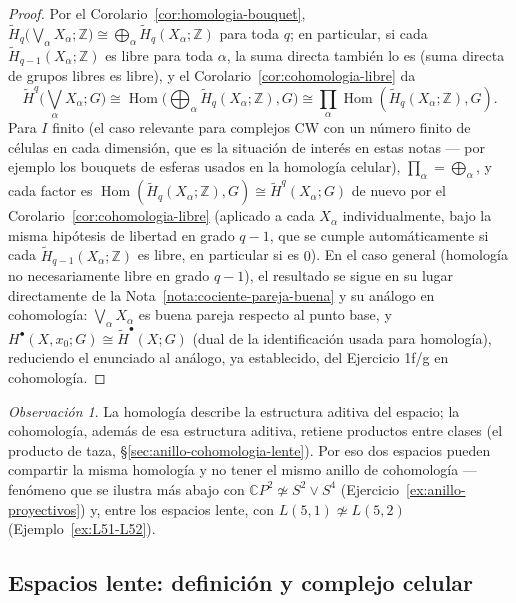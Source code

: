 \documentclass[11pt,a4paper]{article}
\theoremstyle{plain}
\theoremstyle{definition}
\theoremstyle{remark}
\newtheorem{remark}[theorem]{Observación}
\newcommand{\ZZ}{\mathbb Z}
\newcommand{\CC}{\mathbb C}
\DeclareMathOperator{\Hom}{Hom}
\begin{document}
\begin{proof}
Por el Corolario~\ref{cor:homologia-bouquet},
$\tilde H_q\big(\bigvee_\alpha X_\alpha;\ZZ\big)\cong\bigoplus_\alpha\tilde H_q(X_\alpha;\ZZ)$
para toda $q$; en particular, si cada $\tilde H_{q-1}(X_\alpha;\ZZ)$ es
libre para toda $\alpha$, la suma directa también lo es (suma directa de
grupos libres es libre), y el Corolario~\ref{cor:cohomologia-libre} da
\[
\tilde H^q\Big(\bigvee_\alpha X_\alpha;G\Big)\cong\Hom\Big(\bigoplus_\alpha\tilde H_q(X_\alpha;\ZZ),G\Big)\cong\prod_\alpha\Hom(\tilde H_q(X_\alpha;\ZZ),G).
\]
Para $I$ finito (el caso relevante para complejos CW con un número finito
de células en cada dimensión, que es la situación de interés en estas
notas --- por ejemplo los bouquets de esferas usados en la homología
celular), $\prod_\alpha=\bigoplus_\alpha$, y cada factor es
$\Hom(\tilde H_q(X_\alpha;\ZZ),G)\cong\tilde H^q(X_\alpha;G)$ de nuevo por
el Corolario~\ref{cor:cohomologia-libre} (aplicado a cada $X_\alpha$
individualmente, bajo la misma hipótesis de libertad en grado $q-1$, que
se cumple automáticamente si cada $\tilde H_{q-1}(X_\alpha;\ZZ)$ es libre,
en particular si es $0$). En el caso general (homología no
necesariamente libre en grado $q-1$), el resultado se sigue en su lugar
directamente de la Nota~\ref{nota:cociente-pareja-buena} y su análogo en
cohomología: $\bigvee_\alpha X_\alpha$ es buena pareja respecto al punto
base, y $H^\bullet(X,x_0;G)\cong\tilde H^\bullet(X;G)$ (dual de la
identificación usada para homología), reduciendo el enunciado al
análogo, ya establecido, del Ejercicio 1f/g en cohomología.
\end{proof}

\begin{remark}
\label{obs:homologia-vs-cohomologia}
La homología describe la estructura aditiva del espacio; la cohomología,
además de esa estructura aditiva, retiene productos entre clases (el
producto de taza, \S\ref{sec:anillo-cohomologia-lente}). Por eso dos
espacios pueden compartir la misma homología y no tener el mismo anillo de
cohomología --- fenómeno que se ilustra más abajo con
$\CC P^2\not\simeq S^2\vee S^4$ (Ejercicio~\ref{ex:anillo-proyectivos}) y,
entre los espacios lente, con $L(5,1)\not\simeq L(5,2)$
(Ejemplo~\ref{ex:L51-L52}).
\end{remark}

\subsection{Espacios lente: definición y complejo celular}
\label{sec:espacios-lente-apendice}
\end{document}
